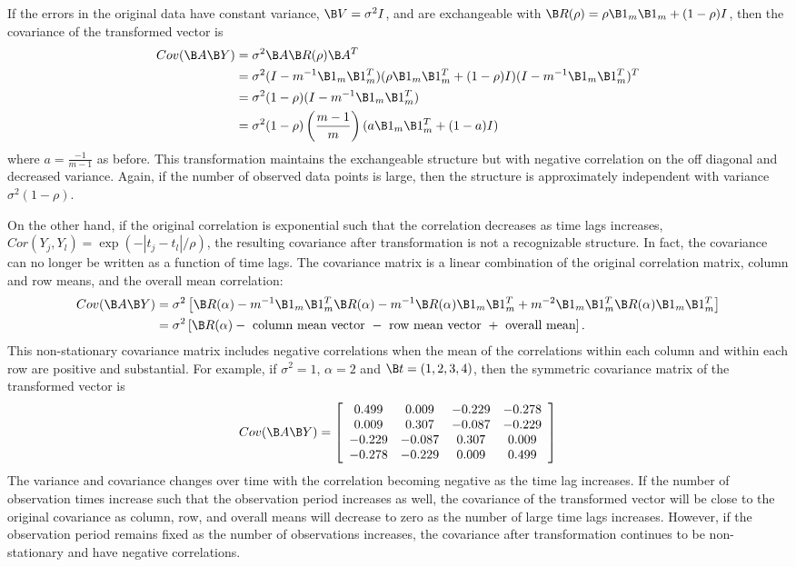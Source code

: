  If the errors in the original data have constant variance, $\B V=\sigma^{2}I$, and are exchangeable with $\B R(\rho) = \rho\B 1_{m} \B 1_{m} + (1-\rho) I$, then the covariance of the transformed vector is
 \begin{align*}
 Cov(\B A\B Y) &= \sigma^{2}\B A\B R(\rho)\B A^{T}\\
 &= \sigma^{2}(I-m^{-1}\B1_{m}\B1_{m}^{T})(\rho\B1_{m}\B1_{m}^{T}+(1-\rho)I)(I-m^{-1}\B1_{m}\B1_{m}^{T})^{T}\\
 &= \sigma^{2}(1-\rho)(I-m^{-1}\B1_{m}\B1_{m}^{T})\\
 &=\sigma^{2}(1-\rho)\left(\frac{m-1}{m}\right)(a\B 1_{m}\B 1_{m}^{T}+ (1-a)I)
 \end{align*} 
 where $a=\frac{-1}{m-1}$ as before. This transformation maintains the exchangeable structure but with negative correlation on the off diagonal and decreased variance.  Again, if the number of observed data points is large, then the structure is approximately independent with variance $\sigma^{2}(1-\rho)$.

 On the other hand, if the original correlation is exponential such that the correlation decreases as time lags increases, $Cor(Y_{j},Y_{l}) = \exp(-|t_{j}-t_{l}|/\rho)$, the resulting covariance after transformation is not a recognizable structure. In fact, the covariance can no longer be written as a function of time lags. The covariance matrix is a linear combination of the original correlation matrix, column and row means, and the overall mean correlation:
   \begin{align*}
 Cov(\B A\B Y) &= \sigma^{2}\left[\B R(\alpha)-m^{-1}\B1_{m}\B1_{m}^{T}\B R(\alpha)-m^{-1}\B R(\alpha)\B1_{m}\B1_{m}^{T} + m^{-2}\B1_{m}\B1_{m}^{T}\B R(\alpha)\B1_{m}\B1_{m}^{T}\right]\\
  &= \sigma^{2}\left[\B R(\alpha)-\text{ column mean vector }-\text{ row mean vector } + \text{ overall mean}\right].
 \end{align*} 
 This non-stationary covariance matrix includes negative correlations when the mean of the correlations within each column and within each row are positive and substantial. For example, if $\sigma^{2}=1$, $\alpha = 2$ and $\B t=(1,2,3,4)$, then the symmetric covariance matrix of the transformed vector is
$$ Cov(\B A\B Y) = \left[ \begin{array}{cccc}
 0.499&  0.009& -0.229& -0.278\\
  0.009&  0.307& -0.087& -0.229\\
 -0.229& -0.087&  0.307&  0.009\\
 -0.278& -0.229&  0.009&  0.499
\end{array}\right]$$
The variance and covariance changes over time with the correlation becoming negative as the time lag increases.  If the number of observation times increase such that the observation period increases as well, the covariance of the transformed vector will be close to the original covariance as column, row, and overall means will decrease to zero as the number of large time lags increases. However, if the observation period remains fixed as the number of observations increases, the covariance after transformation continues to be non-stationary and have negative correlations.  

